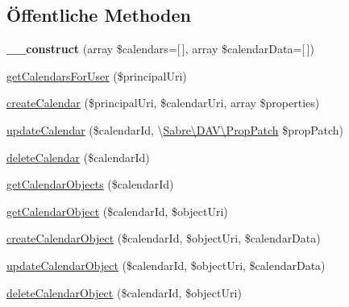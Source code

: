 \subsection*{Öffentliche Methoden}
\begin{DoxyCompactItemize}
\item 
\mbox{\label{class_sabre_1_1_cal_d_a_v_1_1_backend_1_1_mock_a3f7d6709e87e0a60edd3699947e39d6b}} 
{\bfseries \+\_\+\+\_\+construct} (array \$calendars=\mbox{[}$\,$\mbox{]}, array \$calendar\+Data=\mbox{[}$\,$\mbox{]})
\item 
\mbox{\hyperlink{class_sabre_1_1_cal_d_a_v_1_1_backend_1_1_mock_a97477c67412f556a2dbaf70c8632642e}{get\+Calendars\+For\+User}} (\$principal\+Uri)
\item 
\mbox{\hyperlink{class_sabre_1_1_cal_d_a_v_1_1_backend_1_1_mock_adbaaeee2f6d41b5cc388f2935a42e90d}{create\+Calendar}} (\$principal\+Uri, \$calendar\+Uri, array \$properties)
\item 
\mbox{\hyperlink{class_sabre_1_1_cal_d_a_v_1_1_backend_1_1_mock_ab8b52659a3074c8d726ab5674181d4d7}{update\+Calendar}} (\$calendar\+Id, \textbackslash{}\mbox{\hyperlink{class_sabre_1_1_d_a_v_1_1_prop_patch}{Sabre\textbackslash{}\+D\+A\+V\textbackslash{}\+Prop\+Patch}} \$prop\+Patch)
\item 
\mbox{\hyperlink{class_sabre_1_1_cal_d_a_v_1_1_backend_1_1_mock_a8d4df88fced9cb5dadb5f35c13752277}{delete\+Calendar}} (\$calendar\+Id)
\item 
\mbox{\hyperlink{class_sabre_1_1_cal_d_a_v_1_1_backend_1_1_mock_a07387ba01145903a1214b2b3c4b3131e}{get\+Calendar\+Objects}} (\$calendar\+Id)
\item 
\mbox{\hyperlink{class_sabre_1_1_cal_d_a_v_1_1_backend_1_1_mock_a1dc1f798a5aef4f1741837a623a5d6ad}{get\+Calendar\+Object}} (\$calendar\+Id, \$object\+Uri)
\item 
\mbox{\hyperlink{class_sabre_1_1_cal_d_a_v_1_1_backend_1_1_mock_a602fb01816d08265d18094b195db0196}{create\+Calendar\+Object}} (\$calendar\+Id, \$object\+Uri, \$calendar\+Data)
\item 
\mbox{\hyperlink{class_sabre_1_1_cal_d_a_v_1_1_backend_1_1_mock_a73aa850fd884a9a2fde90d0e819e2336}{update\+Calendar\+Object}} (\$calendar\+Id, \$object\+Uri, \$calendar\+Data)
\item 
\mbox{\hyperlink{class_sabre_1_1_cal_d_a_v_1_1_backend_1_1_mock_ae8b62f1520ff22dd4f5b67c32294e22e}{delete\+Calendar\+Object}} (\$calendar\+Id, \$object\+Uri)
\end{DoxyCompactItemize}
